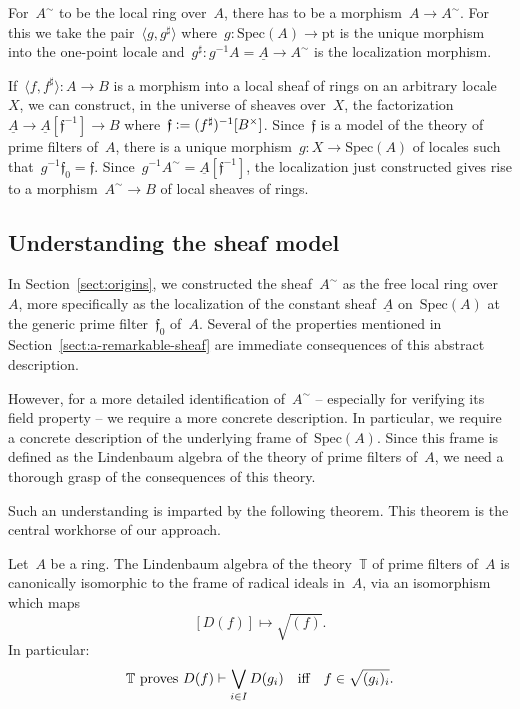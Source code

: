 \documentclass{ws-rv9x6}
\newcommand{\TT}{\mathbb{T}}
\newcommand{\fff}{\mathfrak{f}}
\newcommand{\defeq}{\vcentcolon=}
\newcommand{\Spec}{\mathrm{Spec}}
\renewcommand{\_}{\mathpunct{.}}
\newcommand{\?}{\,{:}\,}
\newcommand{\pt}{\mathrm{pt}}
\begin{document}
For~$A^\sim$ to be the local ring over~$A$, there has to be a morphism~$A \to
A^\sim$. For this we take the pair~$\langle g, g^\sharp \rangle$ where~$g :
\Spec(A) \to \pt$ is the unique morphism into the one-point locale
and~$g^\sharp : g^{-1}A = \underline{A} \to A^\sim$ is the localization
morphism.

If~$\langle f,f^\sharp \rangle : A \to B$ is a morphism into a local sheaf of
rings on an arbitrary locale~$X$, we can construct, in the universe of sheaves
over~$X$, the factorization~$\underline{A} \to
\underline{A}[\fff^{-1}] \to B$ where~$\fff \defeq
(f^\sharp)^{-1}[B^\times]$. Since~$\fff$ is a model of the theory of prime
filters of~$A$, there is a unique morphism~$g : X \to \Spec(A)$ of locales such
that~$g^{-1}\fff_0 = \fff$. Since~$g^{-1}A^\sim = \underline{A}[\fff^{-1}]$,
the localization just constructed gives rise to a morphism~$A^\sim \to B$ of
local sheaves of rings.


\subsection{Understanding the sheaf model}
\label{sect:understanding}

In Section~\ref{sect:origins}, we constructed the sheaf~$A^\sim$ as the free
local ring over~$A$, more specifically as the localization of the constant
sheaf~$\underline{A}$ on~$\Spec(A)$ at the generic prime filter~$\fff_0$
of~$A$. Several of the properties mentioned in
Section~\ref{sect:a-remarkable-sheaf} are immediate consequences of this
abstract description.

However, for a more detailed identification of~$A^\sim$ -- especially for
verifying its field property -- we require a more concrete description. In
particular, we require a concrete description of the underlying frame
of~$\Spec(A)$. Since this frame is defined as the Lindenbaum algebra of the
theory of prime filters of~$A$, we need a thorough grasp of the consequences of
this theory.

Such an understanding is imparted by the following theorem. This theorem is the
central workhorse of our approach.

\begin{theorem}\label{thm:workhorse}
Let~$A$ be a ring. The Lindenbaum algebra of the theory~$\TT$ of prime filters
of~$A$ is canonically isomorphic to the frame of radical ideals in~$A$, via an
isomorphism which maps
\[ [D(f)] \longmapsto \sqrt{(f)}. \]
In particular:
\[
  \textnormal{$\TT$ proves~$D(f) \vdash \bigvee_{i \in I} D(g_i)$} \quad\text{iff}\quad
    f \in \sqrt{(g_i)_i}. \]
\end{theorem}
\end{document}
